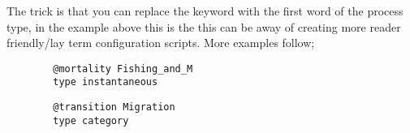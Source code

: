 The trick is that you can replace the keyword  with the first word of the process type, in the example above this is the  this can be away of creating more reader friendly/lay term configuration scripts. More examples follow;

{\small{\begin{verbatim}
		@mortality Fishing_and_M
		type instantaneous
		\end{verbatim}}}

{\small{\begin{verbatim}
		@transition Migration
		type category
		\end{verbatim}}}
\textsl{}
